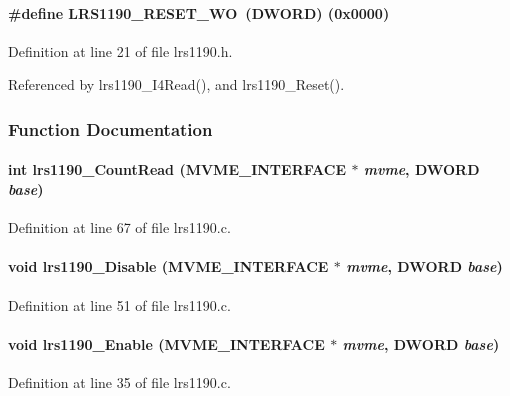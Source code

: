 \paragraph[{LRS1190\_\-RESET\_\-WO}]{\setlength{\rightskip}{0pt plus 5cm}\#define LRS1190\_\-RESET\_\-WO~({\bf DWORD}) (0x0000)}\hfill\label{lrs1190_8h_a25fd7e16f289f571d45bd9c8f6fe9b0f}


Definition at line 21 of file lrs1190.h.

Referenced by lrs1190\_\-I4Read(), and lrs1190\_\-Reset().

\subsubsection{Function Documentation}
\paragraph[{lrs1190\_\-CountRead}]{\setlength{\rightskip}{0pt plus 5cm}int lrs1190\_\-CountRead ({\bf MVME\_\-INTERFACE} $\ast$ {\em mvme}, \/  {\bf DWORD} {\em base})}\hfill\label{lrs1190_8h_a351573dde2decf49df9528a3290fdaac}


Definition at line 67 of file lrs1190.c.
\paragraph[{lrs1190\_\-Disable}]{\setlength{\rightskip}{0pt plus 5cm}void lrs1190\_\-Disable ({\bf MVME\_\-INTERFACE} $\ast$ {\em mvme}, \/  {\bf DWORD} {\em base})}\hfill\label{lrs1190_8h_ae645a9766fb8dc4a5ecc0022d7d1bb13}


Definition at line 51 of file lrs1190.c.
\paragraph[{lrs1190\_\-Enable}]{\setlength{\rightskip}{0pt plus 5cm}void lrs1190\_\-Enable ({\bf MVME\_\-INTERFACE} $\ast$ {\em mvme}, \/  {\bf DWORD} {\em base})}\hfill\label{lrs1190_8h_afbd4b1118296807316f03e0c661dc16d}


Definition at line 35 of file lrs1190.c.
